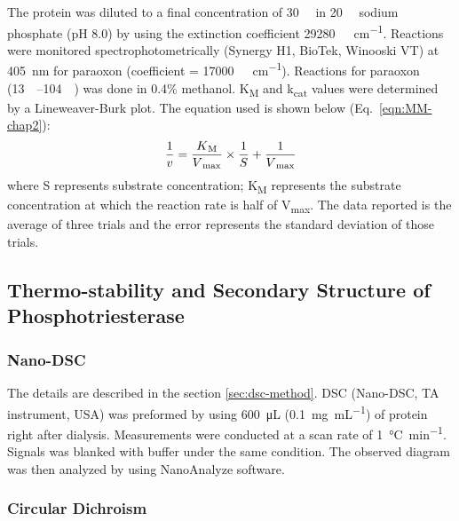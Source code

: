 \begin{refsection}
The protein was diluted to a final concentration of \SI{30}{\nano\Molar} in
\SI{20}{\milli\Molar} sodium phosphate (pH 8.0) by using the extinction
coefficient \SI{29280}{\per\Molar\per\cm}. Reactions were monitored
spectrophotometrically (Synergy H1, BioTek, Winooski VT) at \SI{405}{\nm} for
paraoxon (coefficient = \SI{17000}{\per\Molar\per\cm}).  Reactions for paraoxon
(\SIrange{13}{104}{\micro\Molar}) was done in 0.4\% methanol.
K\textsubscript{M} and k\textsubscript{cat} values were determined by a
Lineweaver-Burk plot.\cite{Baker2011b} The equation used is shown below
(Eq.~\ref{eqn:MM-chap2}): 
\begin{equation} 
    \frac{1}{v} =
    \frac{K\textsubscript{M}}{V\textsubscript{max}}\times\frac{1}{S} +
    \frac{1}{V\textsubscript{max}} 
    \label{eqn:MM-chap2}
\end{equation}
where S represents substrate concentration; K\textsubscript{M} represents the
substrate concentration at which the reaction rate is half of
V\textsubscript{max}. The data reported is the average of three trials and the
error represents the standard deviation of those trials.

\subsection{Thermo-stability and Secondary Structure of Phosphotriesterase}

\subsubsection{Nano-DSC}

The details are described in the section \ref{sec:dsc-method}. DSC (Nano-DSC,
TA instrument, USA) was preformed by using \SI{600}{\micro\L}
(\SI{0.1}{\mg\per\mL}) of protein right after dialysis. Measurements were
conducted at a scan rate of \SI{1}{\celsius\per\minute}. Signals was blanked with
buffer under the same condition.  The observed diagram was then analyzed by
using NanoAnalyze software.

\subsubsection{Circular Dichroism}


\end{refsection}
